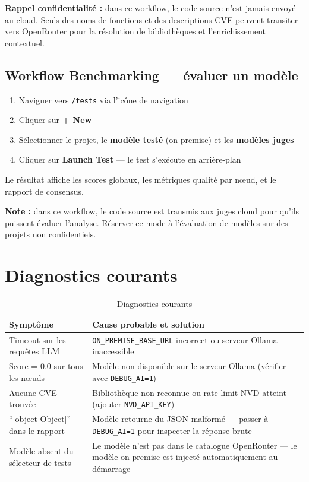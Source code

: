 \documentclass[a4paper, 12pt, hidelinks]{article}
\begin{document}
\begin{mdframed}[backgroundcolor=LightBlue]
\textbf{Rappel confidentialité :} dans ce workflow, le code source n'est jamais envoyé au cloud. Seuls des noms de fonctions et des descriptions CVE peuvent transiter vers OpenRouter pour la résolution de bibliothèques et l'enrichissement contextuel.
\end{mdframed}

\subsection*{Workflow Benchmarking — évaluer un modèle}

\begin{enumerate}
  \item Naviguer vers \texttt{/tests} via l'icône de navigation
  \item Cliquer sur \textbf{+ New}
  \item Sélectionner le projet, le \textbf{modèle testé} (on-premise) et les \textbf{modèles juges}
  \item Cliquer sur \textbf{Launch Test} — le test s'exécute en arrière-plan
\end{enumerate}

Le résultat affiche les scores globaux, les métriques qualité par nœud, et le rapport de consensus.

\begin{mdframed}[backgroundcolor=LightYellow]
\textbf{Note :} dans ce workflow, le code source est transmis aux juges cloud pour qu'ils puissent évaluer l'analyse. Réserver ce mode à l'évaluation de modèles sur des projets non confidentiels.
\end{mdframed}

\section{Diagnostics courants}

\begin{table}[H]
  \centering
  \begin{tabularx}{\textwidth}{l X}
    \toprule
    \textbf{Symptôme} & \textbf{Cause probable et solution} \\
    \midrule
    Timeout sur les requêtes LLM & \texttt{ON\_PREMISE\_BASE\_URL} incorrect ou serveur Ollama inaccessible \\
    Score = 0.0 sur tous les nœuds & Modèle non disponible sur le serveur Ollama (vérifier avec \texttt{DEBUG\_AI=1}) \\
    Aucune CVE trouvée & Bibliothèque non reconnue ou rate limit NVD atteint (ajouter \texttt{NVD\_API\_KEY}) \\
    ``[object Object]'' dans le rapport & Modèle retourne du JSON malformé --- passer à \texttt{DEBUG\_AI=1} pour inspecter la réponse brute \\
    Modèle absent du sélecteur de tests & Le modèle n'est pas dans le catalogue OpenRouter --- le modèle on-premise est injecté automatiquement au démarrage \\
    \bottomrule
  \end{tabularx}
  \caption{Diagnostics courants}
\end{table}
\end{document}
